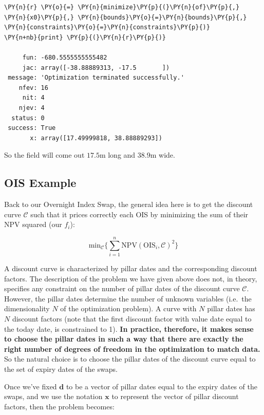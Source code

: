     \begin{tcolorbox}[breakable, size=fbox, boxrule=1pt, pad at break*=1mm,colback=cellbackground, colframe=cellborder]
\begin{Verbatim}[commandchars=\\\{\}]
\PY{n}{r} \PY{o}{=} \PY{n}{minimize}\PY{p}{(}\PY{n}{of}\PY{p}{,} \PY{n}{x0}\PY{p}{,} \PY{n}{bounds}\PY{o}{=}\PY{n}{bounds}\PY{p}{,} \PY{n}{constraints}\PY{o}{=}\PY{n}{constraints}\PY{p}{)}
\PY{n+nb}{print} \PY{p}{(}\PY{n}{r}\PY{p}{)}

     fun: -680.5555555555482
     jac: array([-38.88889313, -17.5       ])
 message: 'Optimization terminated successfully.'
    nfev: 16
     nit: 4
    njev: 4
  status: 0
 success: True
       x: array([17.49999818, 38.88889293])
    \end{Verbatim}
\end{tcolorbox}

    So the field will come out \(17.5\)m long and \(38.9\)m wide.

\subsection{OIS Example}\label{ois-example}
Back to our Overnight Index Swap, the general idea here is to get the discount curve \(\mathcal{C}\) such that it prices correctly each OIS by minimizing the sum of their NPV squared (our \(f_i\)):

\[\mathrm{min}_{\mathcal{C}} \Big\{\sum_{i=1}^{n}\mathrm{NPV}(\mathrm{OIS}_i, \mathcal{C})^2\Big\}\]

A discount curve is characterized by pillar dates and the corresponding discount factors. The description of the problem we have given above does not, in theory, specifies any constraint on the number of pillar dates of the discount curve \(\mathcal{C}\). However, the pillar dates determine the number of unknown variables (i.e.~the dimensionality \(N\) of the optimization problem). A curve with \(N\) pillar dates has \(N\) discount factors (note that the first discount factor with value date equal to the today date, is constrained to 1). \textbf{In practice, therefore, it makes sense to choose the pillar dates in such a way that there are exactly the right number of degrees of freedom in the optimization to match data.} So the natural choice is to choose the pillar dates of the discount curve equal to the set of expiry dates of the swaps.

Once we've fixed \(\mathbf{d}\) to be a vector of pillar dates equal to the expiry dates of the swaps, and we use the notation \(\mathbf{x}\) to represent the vector of pillar discount factors, then the problem becomes:

